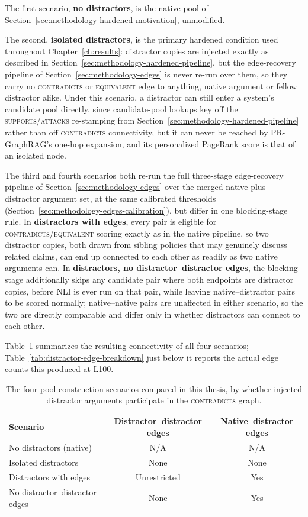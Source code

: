 The first scenario, \textbf{no distractors}, is the native pool of
Section~\ref{sec:methodology-hardened-motivation}, unmodified.

The second, \textbf{isolated distractors}, is the primary hardened condition used throughout
Chapter~\ref{ch:results}: distractor copies are injected exactly as described in
Section~\ref{sec:methodology-hardened-pipeline}, but the edge-recovery pipeline of
Section~\ref{sec:methodology-edges} is never re-run over them, so they carry no
\textsc{contradicts} or \textsc{equivalent} edge to anything, native argument or fellow distractor
alike. Under this scenario, a distractor can still enter a system's candidate pool directly, since
candidate-pool lookups key off the \textsc{supports}/\textsc{attacks} re-stamping from
Section~\ref{sec:methodology-hardened-pipeline} rather than off \textsc{contradicts} connectivity,
but it can never be reached by PR-GraphRAG's one-hop expansion, and its personalized PageRank
score is that of an isolated node.

The third and fourth scenarios both re-run the full three-stage edge-recovery pipeline of
Section~\ref{sec:methodology-edges} over the merged native-plus-distractor argument set, at the
same calibrated thresholds (Section~\ref{sec:methodology-edges-calibration}), but differ in one
blocking-stage rule. In \textbf{distractors with edges}, every pair is eligible for
\textsc{contradicts}/\textsc{equivalent} scoring exactly as in the native pipeline, so two
distractor copies, both drawn from sibling policies that may genuinely discuss related claims, can
end up connected to each other as readily as two native arguments can. In \textbf{distractors, no
distractor--distractor edges}, the blocking stage additionally skips any candidate pair where both
endpoints are distractor copies, before NLI is ever run on that pair, while leaving
native--distractor pairs to be scored normally; native--native pairs are unaffected in either
scenario, so the two are directly comparable and differ only in whether distractors can connect to
each other.

Table~\ref{tab:hardened-scenarios} summarizes the resulting connectivity of all four scenarios;
Table~\ref{tab:distractor-edge-breakdown} just below it reports the actual edge counts this
produced at L100.

\begin{table}[htbp]
\centering
\caption{The four pool-construction scenarios compared in this thesis, by whether injected
distractor arguments participate in the \textsc{contradicts} graph.}
\label{tab:hardened-scenarios}
\begin{tabular}{lcc}
\toprule
\textbf{Scenario} & \textbf{Distractor--distractor edges} & \textbf{Native--distractor edges} \\
\midrule
No distractors (native) & N/A & N/A \\
Isolated distractors & None & None \\
Distractors with edges & Unrestricted & Yes \\
No distractor--distractor edges & None & Yes \\
\bottomrule
\end{tabular}
\end{table}

